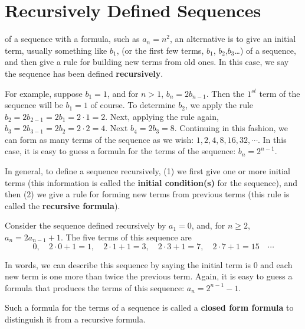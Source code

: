 \chapter{Recursively Defined Sequences}

 of  a sequence with a formula, such as $a_n = n^2$, 
an alternative is to give an initial term, usually something like $b_1$, (or the first few terms, $b_1$, $b_2$,$b_3$\dots) of a sequence, and
then give a rule for building new terms from old ones. In this case, we say the sequence
has been defined {\bfseries recursively}. 

\begin{exmp}
 For example, suppose $b_1=1$, and for $n>1$, $b_n = 2b_{n-1}$. Then the $1^{st}$ 
term of the sequence will be $b_1=1$ of course. To determine $b_2$, we apply the
rule $b_2 = 2b_{2-1} = 2b_1 = 2\cdot 1 = 2$. Next, applying the rule again, 
 $b_3= 2b_{3-1} = 2b_2 = 2\cdot2=4$. Next $b_4 = 2b_3 = 8$. Continuing in this fashion,
we can form as many terms of the sequence as we wish: $1,2,4,8,16,32,\cdots$.
In this case, it is easy to guess a formula for the terms of the sequence: 
$b_n=2^{n-1}$.
\end{exmp}

In general, to define a sequence recursively, (1) we first give one or more initial terms
(this information is called the {\bfseries initial condition(s)} for the sequence), and
then (2) we give a rule for forming new terms from previous terms (this rule
is called the {\bfseries recursive formula}).

\begin{exmp}\label{exmp:recursive seq}
 Consider the sequence defined recursively by $a_1 = 0$, and, for
 $n\geq 2$, $a_n = 2a_{n-1} +1$. The five terms of this sequence are
 \[
 0,\quad 2\cdot0+1=1,\quad 2\cdot1+1=3,\quad 2\cdot3+1 = 7,
   \quad 2\cdot7+1=15\quad \cdots
 \]


 In words, 
we can describe this sequence by saying the initial term is $0$ and each
new term is one more than twice the previous term.
Again, it is easy to guess a formula that produces the terms of this sequence:
$a_n = 2^{n-1}-1$.  
\end{exmp}
Such a formula for the terms of a sequence is called a {\bf
closed form formula} to distinguish it from a recursive formula.

